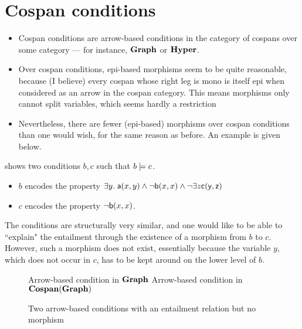 \section{Cospan conditions}

\begin{itemize}
\item Cospan conditions are arrow-based conditions in the category of cospans over some category --- for instance, $\textbf{Graph}$ or $\textbf{Hyper}$.

\item Over cospan conditions, epi-based morphisms seem to be quite reasonable, because (I believe) every cospan whose right leg is mono is itself epi when considered as an arrow in the cospan category. This means morphisms only cannot split variables, which seems hardly a restriction

\item Nevertheless, there are fewer (epi-based) morphisms over cospan conditions than one would wish, for the same reason as before. An example is given below.
\end{itemize}

\begin{example}
 shows two conditions $b,c$ such that $b\models c$.
\begin{itemize}
\item $b$ encodes the property $\exists y.\; \mathsf{a}(x,y) \wedge \neg \mathsf{b}(x,x) \wedge \neg \exists z\sl \mathsf{c}(y,z)$
\item $c$ encodes the property $\neg\mathsf{b}(x,x)$.
\end{itemize}
The conditions are structurally very similar, and one would like to be able to ``explain" the entailment through the existence of a morphism from $b$ to $c$. However, such a morphism does not exist, essentially because the variable $y$, which does not occur in $c$, has to be kept around on the lower level of $b$.
\end{example}

\begin{figure}
\centering
\subcaptionbox
  {Arrow-based condition in $\textbf{Graph}$}
  {}
\subcaptionbox
  {Arrow-based condition in $\textbf{Cospan}(\textbf{Graph})$}
  {}%

\caption{Two arrow-based conditions with an entailment relation but no morphism}
\end{figure}
